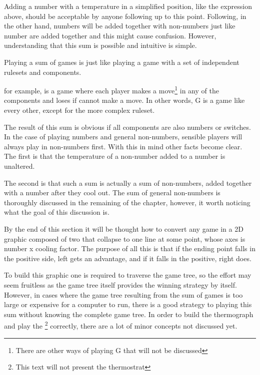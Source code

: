Adding a number with a temperature in a simplified position, like the expression above, should be acceptable by anyone following up to this point. Following, in the other hand, numbers will be added together with non-numbers just like number are added together and this might cause confusion. However, understanding that this sum is possible and intuitive is simple.

Playing a sum of games is just like playing a game with a set of independent rulesets and components. \begin{center}
\end{center}
for example, is a game where each player makes a move\footnote{There are other ways of playing G that will not be discussed} in any of the components and loses if cannot make a move. In other words, G is a game like every other, except for the more complex ruleset.

The result of this sum is obvious if all components are also numbers or switches. In the case of playing numbers and general non-numbers, sensible players will always play in non-numbers first. With this in mind other facts become clear. The first is that the temperature of a non-number added to a number is unaltered.

The second is that such a sum is actually a sum of non-numbers, added together with a number after they cool out. The sum of general non-numbers is thoroughly discussed in the remaining of the chapter, however, it worth noticing what the goal of this discussion is.

By the end of this section it will be thought how to convert any game in a 2D graphic composed of two  that collapse to one line at some point, whose axes is number x cooling factor. The purpose of all this is that if the ending point falls in the positive side, left gets an advantage, and if it falls in the positive, right does.

To build this graphic one is required to traverse the game tree, so the effort may seem fruitless as the game tree itself provides the winning strategy by itself. However, in cases where the game tree resulting from the sum of games is too large or expensive for a computer to run, there is a good strategy to playing this sum without knowing the complete game tree. In order to build the thermograph and play the \footnote{This text will not present the thermostrat} correctly, there are a lot of minor concepts not discussed yet.

